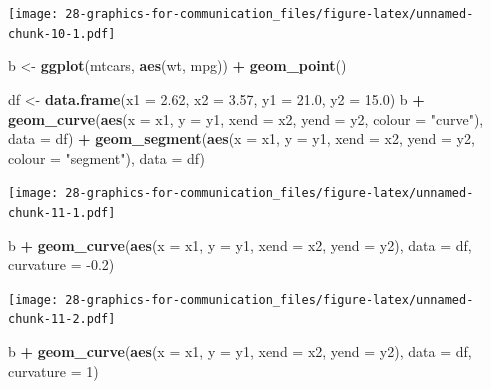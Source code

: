 \documentclass[]{book}
\newenvironment{Shaded}{\begin{snugshade}}{\end{snugshade}}
\newcommand{\DataTypeTok}[1]{\textcolor[rgb]{0.13,0.29,0.53}{#1}}
\newcommand{\DecValTok}[1]{\textcolor[rgb]{0.00,0.00,0.81}{#1}}
\newcommand{\FloatTok}[1]{\textcolor[rgb]{0.00,0.00,0.81}{#1}}
\newcommand{\KeywordTok}[1]{\textcolor[rgb]{0.13,0.29,0.53}{\textbf{#1}}}
\newcommand{\NormalTok}[1]{#1}
\newcommand{\OperatorTok}[1]{\textcolor[rgb]{0.81,0.36,0.00}{\textbf{#1}}}
\newcommand{\StringTok}[1]{\textcolor[rgb]{0.31,0.60,0.02}{#1}}
\theoremstyle{definition}
\theoremstyle{definition}
\theoremstyle{definition}
\theoremstyle{remark}
\begin{document}
\begin{enumerate}
  \texttt{[image: 28-graphics-for-communication\_files/figure-latex/unnamed-chunk-10-1.pdf]}

\begin{Shaded}
\begin{Highlighting}[]
\NormalTok{b <-}\StringTok{ }\KeywordTok{ggplot}\NormalTok{(mtcars, }\KeywordTok{aes}\NormalTok{(wt, mpg)) }\OperatorTok{+}
\StringTok{  }\KeywordTok{geom_point}\NormalTok{()}

\NormalTok{df <-}\StringTok{ }\KeywordTok{data.frame}\NormalTok{(}\DataTypeTok{x1 =} \FloatTok{2.62}\NormalTok{, }\DataTypeTok{x2 =} \FloatTok{3.57}\NormalTok{, }\DataTypeTok{y1 =} \FloatTok{21.0}\NormalTok{, }\DataTypeTok{y2 =} \FloatTok{15.0}\NormalTok{)}
\NormalTok{b }\OperatorTok{+}
\StringTok{ }\KeywordTok{geom_curve}\NormalTok{(}\KeywordTok{aes}\NormalTok{(}\DataTypeTok{x =}\NormalTok{ x1, }\DataTypeTok{y =}\NormalTok{ y1, }\DataTypeTok{xend =}\NormalTok{ x2, }\DataTypeTok{yend =}\NormalTok{ y2, }\DataTypeTok{colour =} \StringTok{"curve"}\NormalTok{), }\DataTypeTok{data =}\NormalTok{ df) }\OperatorTok{+}
\StringTok{ }\KeywordTok{geom_segment}\NormalTok{(}\KeywordTok{aes}\NormalTok{(}\DataTypeTok{x =}\NormalTok{ x1, }\DataTypeTok{y =}\NormalTok{ y1, }\DataTypeTok{xend =}\NormalTok{ x2, }\DataTypeTok{yend =}\NormalTok{ y2, }\DataTypeTok{colour =} \StringTok{"segment"}\NormalTok{), }\DataTypeTok{data =}\NormalTok{ df)}
\end{Highlighting}
\end{Shaded}

  \texttt{[image: 28-graphics-for-communication\_files/figure-latex/unnamed-chunk-11-1.pdf]}

\begin{Shaded}
\begin{Highlighting}[]
\NormalTok{b }\OperatorTok{+}\StringTok{ }\KeywordTok{geom_curve}\NormalTok{(}\KeywordTok{aes}\NormalTok{(}\DataTypeTok{x =}\NormalTok{ x1, }\DataTypeTok{y =}\NormalTok{ y1, }\DataTypeTok{xend =}\NormalTok{ x2, }\DataTypeTok{yend =}\NormalTok{ y2), }\DataTypeTok{data =}\NormalTok{ df, }\DataTypeTok{curvature =} \FloatTok{-0.2}\NormalTok{)}
\end{Highlighting}
\end{Shaded}

  \texttt{[image: 28-graphics-for-communication\_files/figure-latex/unnamed-chunk-11-2.pdf]}

\begin{Shaded}
\begin{Highlighting}[]
\NormalTok{b }\OperatorTok{+}\StringTok{ }\KeywordTok{geom_curve}\NormalTok{(}\KeywordTok{aes}\NormalTok{(}\DataTypeTok{x =}\NormalTok{ x1, }\DataTypeTok{y =}\NormalTok{ y1, }\DataTypeTok{xend =}\NormalTok{ x2, }\DataTypeTok{yend =}\NormalTok{ y2), }\DataTypeTok{data =}\NormalTok{ df, }\DataTypeTok{curvature =} \DecValTok{1}\NormalTok{)}
\end{Highlighting}
\end{Shaded}


\end{enumerate}
\end{document}
